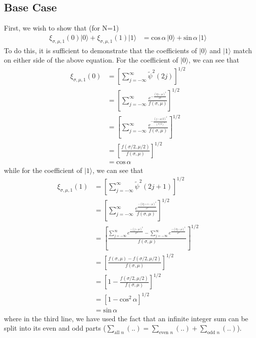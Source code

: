 \documentclass[11pt]{article}
\begin{document}
\subsection*{Base Case}
First, we wish to show that (for N=1)
\begin{align*}
\xi_{\sigma, \mu, 1} (0) \vert 0 \rangle + \xi_{\sigma, \mu, 1} (1) \vert 1 \rangle &= \text{cos}\,  \alpha \, \vert 0 \rangle + \text{sin}\,  \alpha \, \vert 1 \rangle
\end{align*}
To do this, it is sufficient to demonstrate that the coefficients of $\vert 0 \rangle$ and $\vert 1 \rangle$ match on either side of the above equation. For the coefficient of $\vert 0 \rangle$, we can see that
\begin{align*}
\xi_{\sigma, \mu, 1} (0) &= \left[ \sum_{j=-\infty}^{\infty} \tilde{\psi}^{2} (2j) \right]^{1/2} \\
&= \left[ \sum_{j=-\infty}^{\infty} \frac{e^{-\frac{(2j - \mu)^2}{\sigma^2}}}{f(\sigma, \mu)} \right]^{1/2} \\
&= \left[ \sum_{j=-\infty}^{\infty} \frac{e^{-\frac{(j - \mu/2)^2}{(\sigma/2)^2}}}{f(\sigma, \mu)} \right]^{1/2} \\
&= \left[ \frac{f(\sigma/2, \mu/2)}{f(\sigma, \mu)} \right]^{1/2} \\
&= \text{cos} \, \alpha
\end{align*}
while for the coefficient of $\vert 1 \rangle$, we can see that
\begin{align*}
\xi_{\sigma, \mu, 1} (1) &= \left[ \sum_{j=-\infty}^{\infty} \tilde{\psi}^{2} (2j + 1) \right]^{1/2} \\
&= \left[ \sum_{j=-\infty}^{\infty} \frac{e^{\frac{-(2j + 1 - \mu)^2}{\sigma^2}}}{f(\sigma, \mu)} \right]^{1/2} \\
&= \left[ \frac{\sum_{j=-\infty}^{\infty} e^{\frac{-(j - \mu)^2}{\sigma^2}} - \sum_{j=-\infty}^{\infty} e^{\frac{-(2j - \mu)^2}{\sigma^2}}}{f(\sigma, \mu)}  \right]^{1/2} \\
&= \left[ \frac{f(\sigma, \mu) - f(\sigma/2, \mu/2)}{f(\sigma, \mu)} \right]^{1/2} \\
&= \left[ 1 - \frac{f(\sigma/2, \mu/2)}{f(\sigma, \mu)} \right]^{1/2} \\
&= \left[ 1 - \text{cos}^{2} \, \alpha \right]^{1/2} \\
&= \text{sin} \, \alpha
\end{align*}
where in the third line, we have used the fact that an infinite integer sum can be split into its even and odd parts ($\sum_{\text{all } n} (..) = \sum_{\text{even } n} (..) + \sum_{\text{odd } n} (..) $).
\end{document}
